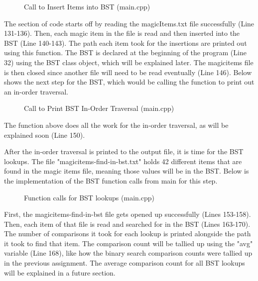 \documentclass[letterpaper, 10pt]{article}
\begin{document}
\begin{figure}[H]
  \centering
   
  \caption{Call to Insert Items into BST (main.cpp)}
  \label{fig:figure3.1-part2}
\end{figure}

\vspace{-1em}
\noindent
The section of code starts off by reading the magicItems.txt file successfully (Line 131-136). Then, each magic item in the file is read and then inserted into the BST (Line 140-143). The path each item took for the insertions are printed out using this function. The BST is declared at the beginning of the program (Line 32) using the BST class object, which will be explained later. The magicitems file is then closed since another file will need to be read eventually (Line 146). Below shows the next step for the BST, which would be calling the function to print out an in-order traversal.

\begin{figure}[H]
  \centering
   
  \caption{Call to Print BST In-Order Traversal (main.cpp)}
  \label{fig:figure3.2}
\end{figure}

\noindent
The function above does all the work for the in-order traversal, as will be explained soon (Line 150).

\vspace{1em}
\noindent
After the in-order traversal is printed to the output file, it is time for the BST lookups. The file "magicitems-find-in-bst.txt" holds 42 different items that are found in the magic items file, meaning those values will be in the BST. Below is the implementation of the BST function calls from main for this step.

\begin{figure}[H]
  \centering
   
  \caption{Function calls for BST lookups (main.cpp)}
  \label{fig:figure3.3}
\end{figure}

\noindent
First, the magicitems-find-in-bst file gets opened up successfully (Lines 153-158). Then, each item of that file is read and searched for in the BST (Lines 163-170). The number of comparisons it took for each lookup is printed alongside the path it took to find that item. The comparison count will be tallied up using the "avg" variable (Line 168), like how the binary search comparison counts were tallied up in the previous assignment. The average comparison count for all BST lookups will be explained in a future section. 
\end{document}
